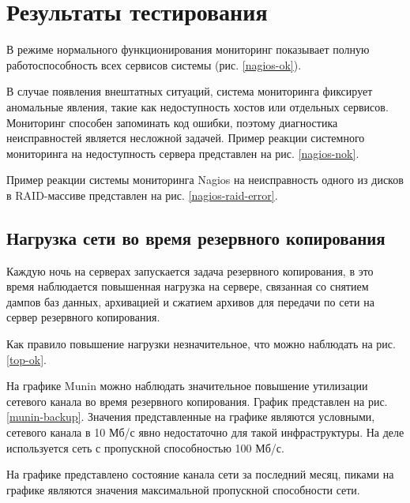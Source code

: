 \section{Результаты тестирования}

В режиме нормального функционирования мониторинг показывает полную работоспособность всех сервисов системы (рис. \ref{nagios-ok}).

В случае появления внештатных ситуаций, система мониторинга фиксирует аномальные явления, такие как недоступность хостов или отдельных сервисов.
Мониторинг способен запоминать код ошибки, поэтому диагностика неисправностей является несложной задачей.
Пример реакции системного мониторинга на недоступность сервера представлен на рис. \ref{nagios-nok}.

Пример реакции системы мониторинга Nagios на неисправность одного из дисков в RAID-массиве представлен на рис. \ref{nagios-raid-error}.

\subsection{Нагрузка сети во время резервного копирования}

Каждую ночь на серверах запускается задача резервного копирования, в это время наблюдается повышенная нагрузка на сервере, связанная со снятием дампов баз данных, архивацией и сжатием архивов для передачи по сети на сервер резервного копирования.

Как правило повышение нагрузки незначительное, что можно наблюдать на рис. \ref{top-ok}.

На графике Munin можно наблюдать значительное повышение утилизации сетевого канала во время резервного копирования.
График представлен на рис. \ref{munin-backup}.
Значения представленные на графике являются условными, сетевого канала в 10 Мб/с явно недостаточно для такой инфраструктуры.
На деле используется сеть с пропускной способностью 100 Мб/с.

На графике представлено состояние канала сети за последний месяц, пиками на графике являются значения максимальной пропускной способности сети.

